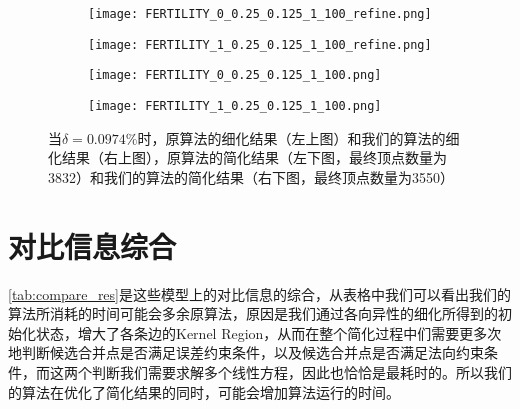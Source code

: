 \begin{figure}[htbp]
  \centering
  \begin{subfigure}[b]{0.4\textwidth}
    \texttt{[image: FERTILITY\_0\_0.25\_0.125\_1\_100\_refine.png]}
  \end{subfigure}
  \begin{subfigure}[b]{0.4\textwidth}
    \texttt{[image: FERTILITY\_1\_0.25\_0.125\_1\_100\_refine.png]}
  \end{subfigure}
  \begin{subfigure}[b]{0.4\textwidth}
    \texttt{[image: FERTILITY\_0\_0.25\_0.125\_1\_100.png]}
  \end{subfigure}
  \begin{subfigure}[b]{0.4\textwidth}
    \texttt{[image: FERTILITY\_1\_0.25\_0.125\_1\_100.png]}
  \end{subfigure}
  \caption[当$\delta=0.0974\%$时fertility结果对比]{当$\delta=0.0974\%$时，原算法的细化结果（左上图）和我们的算法的细化结果（右上图），原算法的简化结果（左下图，最终顶点数量为3832）和我们的算法的简化结果（右下图，最终顶点数量为3550）}
  \label{fig:fertility-res2}
\end{figure}

\section{对比信息综合}
\autoref{tab:compare_res}是这些模型上的对比信息的综合，从表格中我们可以看出我们的算法所消耗的时间可能会多余原算法，原因是我们通过各向异性的细化所得到的初始化状态，增大了各条边的Kernel Region，从而在整个简化过程中们需要更多次地判断候选合并点是否满足误差约束条件，以及候选合并点是否满足法向约束条件，而这两个判断我们需要求解多个线性方程，因此也恰恰是最耗时的。所以我们的算法在优化了简化结果的同时，可能会增加算法运行的时间。

